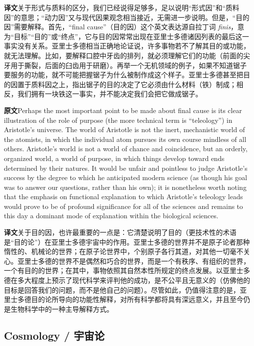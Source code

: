 \documentclass[UTF8,zihao=-4]{ctexart}
\newcommand{\BodyFont}{\fontsize{10.5pt}{15.5pt}\selectfont}
\newcommand{\origlabel}{\textbf{原文}\quad}
\newcommand{\translabel}{\textbf{译文}\quad}
\newcommand{\orig}{\par\noindent\begingroup\BodyFont\origlabel}
\newcommand{\zhline}[1]{\par\endgroup\noindent\begingroup\BodyFont\translabel #1\par\endgroup\vspace{0.35em}}
\begin{document}
\zhline{关于形式与质料的区分，我们已经说得足够多，足以说明“形式因”和“质料因”的意思；“动力因”又与现代因果观念相当接近，无需进一步说明。但是，“目的因”需要解释。首先，“final cause”（目的因）这个英文表达源自拉丁词 \textit{finis}，意为“目标”“目的”或“终点”，它与目的因常常出现在亚里士多德诸因列表的最后这一事实没有关系。亚里士多德相当正确地论证说，许多事物若不了解其目的或功能，就无法理解。比如，要解释口腔中牙齿的排列，就必须理解它们的功能（前面的尖牙用于撕裂，后面的臼齿用于研磨）。再举一个无机领域的例子，如果不知道锯子要服务的功能，就不可能把握锯子为什么被制作成这个样子。亚里士多德甚至把目的因置于质料因之上，指出锯子的目的决定了它必须由什么材料（铁）制成；相反，我们拥有一块铁这一事实，并不能决定我们会把它做成锯子。}

\orig Perhaps the most important point to be made about final cause is its clear illustration of the role of purpose (the more technical term is ``teleology'') in Aristotle's universe. The world of Aristotle is not the inert, mechanistic world of the atomists, in which the individual atom pursues its own course mindless of all others. Aristotle's world is not a world of chance and coincidence, but an orderly, organized world, a world of purpose, in which things develop toward ends determined by their natures. It would be unfair and pointless to judge Aristotle's success by the degree to which he anticipated modern science (as though his goal was to answer our questions, rather than his own); it is nonetheless worth noting that the emphasis on functional explanation to which Aristotle's teleology leads would prove to be of profound significance for all of the sciences and remains to this day a dominant mode of explanation within the biological sciences.

\zhline{关于目的因，也许最重要的一点是：它清楚说明了目的（更技术性的术语是“目的论”）在亚里士多德宇宙中的作用。亚里士多德的世界并不是原子论者那种惰性的、机械论的世界；在原子论世界中，个别原子各行其道，对其他一切毫不关心。亚里士多德的世界不是偶然和巧合的世界，而是一个有秩序、有组织的世界，一个有目的的世界；在其中，事物依照其自然本性所规定的终点发展。以亚里士多德在多大程度上预示了现代科学来评判他的成功，是不公平且无意义的（仿佛他的目标是回答我们的问题，而不是他自己的问题）。尽管如此，仍值得注意的是，亚里士多德目的论所导向的功能性解释，对所有科学都将具有深远意义，并且至今仍是生物科学中的一种主导解释方式。}

\subsection*{Cosmology / 宇宙论}
\end{document}
